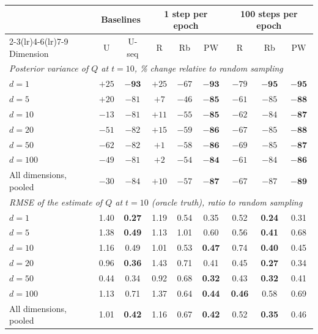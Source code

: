 \begin{tabular}{lcccccccc}
\toprule
 & \multicolumn{2}{c}{Baselines} & \multicolumn{3}{c}{1 step per epoch} & \multicolumn{3}{c}{100 steps per epoch} \\
\cmidrule(lr){2-3}\cmidrule(lr){4-6}\cmidrule(lr){7-9}
Dimension & U & U-seq & R & Rb & PW & R & Rb & PW \\
\midrule
\multicolumn{9}{l}{\emph{Posterior variance of $Q$ at $t=10$, \% change relative to random sampling}} \\
$d=1$ & $+25$ & $\mathbf{-93}$ & $+25$ & $-67$ & $\mathbf{-93}$ & $-79$ & $\mathbf{-95}$ & $\mathbf{-95}$ \\
$d=5$ & $+20$ & $-81$ & $+7$ & $-46$ & $\mathbf{-85}$ & $-61$ & $-85$ & $\mathbf{-88}$ \\
$d=10$ & $-13$ & $-81$ & $+11$ & $-55$ & $\mathbf{-85}$ & $-62$ & $-84$ & $\mathbf{-87}$ \\
$d=20$ & $-51$ & $-82$ & $+15$ & $-59$ & $\mathbf{-86}$ & $-67$ & $-85$ & $\mathbf{-88}$ \\
$d=50$ & $-62$ & $-82$ & $+1$ & $-58$ & $\mathbf{-86}$ & $-69$ & $-85$ & $\mathbf{-87}$ \\
$d=100$ & $-49$ & $-81$ & $+2$ & $-54$ & $\mathbf{-84}$ & $-61$ & $-84$ & $\mathbf{-86}$ \\
\addlinespace[2pt]
All dimensions, pooled & $-30$ & $-84$ & $+10$ & $-57$ & $\mathbf{-87}$ & $-67$ & $-87$ & $\mathbf{-89}$ \\
\midrule
\multicolumn{9}{l}{\emph{RMSE of the estimate of $Q$ at $t=10$ (oracle truth), ratio to random sampling}} \\
$d=1$ & 1.40 & \textbf{0.27} & 1.19 & 0.54 & 0.35 & 0.52 & \textbf{0.24} & 0.31 \\
$d=5$ & 1.38 & \textbf{0.49} & 1.13 & 1.01 & 0.60 & 0.56 & \textbf{0.41} & 0.68 \\
$d=10$ & 1.16 & 0.49 & 1.01 & 0.53 & \textbf{0.47} & 0.74 & \textbf{0.40} & 0.45 \\
$d=20$ & 0.96 & \textbf{0.36} & 1.43 & 0.71 & 0.41 & 0.45 & \textbf{0.27} & 0.34 \\
$d=50$ & 0.44 & 0.34 & 0.92 & 0.68 & \textbf{0.32} & 0.43 & \textbf{0.32} & 0.41 \\
$d=100$ & 1.13 & 0.71 & 1.37 & 0.64 & \textbf{0.44} & \textbf{0.46} & 0.58 & 0.69 \\
\addlinespace[2pt]
All dimensions, pooled & 1.01 & \textbf{0.42} & 1.16 & 0.67 & \textbf{0.42} & 0.52 & \textbf{0.35} & 0.46 \\
\bottomrule
\end{tabular}
